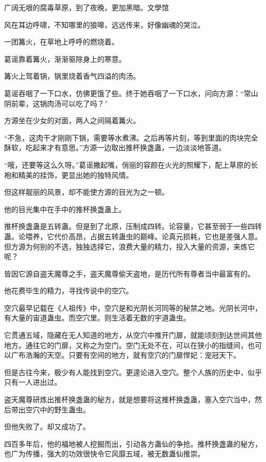 
\begin{this_body}

广阔无垠的腐毒草原，到了夜晚，更加黑暗。文學馆

风在耳边呼啸，不知哪里的狼嗥，远远传来，好像幽魂的哭泣。

一团篝火，在草地上呼呼的燃烧着。

葛谣靠着篝火，渐渐驱除身上的寒意。

篝火上驾着锅，锅里烧着香气四溢的肉汤。

葛谣吞咽了一下口水，仿佛更饿了些。终于她吞咽了一下口水，问向方源：“常山阴前辈，这锅肉汤可以吃了吗？”

方源坐在少女的对面，两人之间隔着篝火。

“不急，这肉干才刚刚下锅，需要等水煮沸。之后再等片刻，等到里面的肉块完全酥软，吃起来才有意思。”方源一边取出推杯换盏蛊，一边淡淡地答道。

“哦，还要等这么久呀。”葛谣撇起嘴，俏丽的容颜在火光的照耀下，配上草原的长袍和精美的挂饰，更显出她的独特风情。

但这样靓丽的风景，却不能使方源的目光为之一顿。

他的目光集中在手中的推杯换盏蛊上。

推杯换盏蛊是五转蛊。但是到了北原，压制成四转。论容量，它甚至弱于一些四转蛊。论喂养，它代价高昂，占据五转蛊虫的巅峰。论真元损耗，它也是差强人意。但方源为何别的不选，独独选择它，浪费大量的精力，投入大量的资源，来炼它呢？

皆因它源自盗天魔尊之手，盗天魔尊偷天盗地，是历代所有尊者当中最富有的。

他花费毕生的精力，寻找传说中的空穴。

空穴最早记载在《人祖传》中，空穴是和光阴长河同等的秘禁之地。光阴长河中，有大量的宙道蛊虫。而空穴里。则生活着无数的宇道蛊虫。

它贯通五域，隐藏在无人知道的地方，从空穴中推开门扉，就能顷刻到达世间其他地方。通往它的门扉，又称之为空门。空门无处不在，可以在狭小的指缝间，也可以广布浩瀚的天空。只要有空间的地方，就有空穴的门扉悍妃：宠冠天下。

但是古往今来，极少有人能找到空穴。更遑论进入空穴。整个人族的历史中，似乎只有一人进出过。

盗天魔尊研炼出推杯换盏蛊的秘方，就是想要将这推杯换盏蛊，塞入空穴当中，然后带出空穴中的野生蛊虫。

但他失败了。却又成功了。

四百多年后，他的福地被人挖掘而出，引动各方蛊仙的争抢。推杯换盏蛊的秘方，也广为传播，强大的功效很快令它风靡五域，被无数蛊仙推崇。


\end{this_body}
